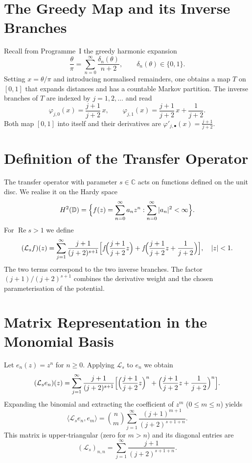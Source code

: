 \documentclass[11pt,a4paper]{article}
\begin{document}
\section{The Greedy Map and its Inverse Branches}
Recall from Programme~I the greedy harmonic expansion
\[
\frac{\theta}{\pi} = \sum_{n=0}^{\infty} \frac{\delta_n(\theta)}{n+2},\qquad \delta_n(\theta)\in\{0,1\}.
\]
Setting \(x = \theta/\pi\) and introducing normalised remainders, one obtains a map \(T\) on \([0,1]\) that expands distances and has a countable Markov partition.  The inverse branches of \(T\) are indexed by \(j=1,2,\dots\) and read
\[
\varphi_{j,0}(x) = \frac{j+1}{j+2}\,x,\qquad 
\varphi_{j,1}(x) = \frac{j+1}{j+2}\,x + \frac{1}{j+2}.
\]
Both map \([0,1]\) into itself and their derivatives are \(\varphi'_{j,\bullet}(x) = \frac{j+1}{j+2}\).

\section{Definition of the Transfer Operator}
The transfer operator with parameter \(s\in\mathbb{C}\) acts on functions defined on the unit disc.  We realise it on the Hardy space
\[
H^2(\mathbb{D}) = \Bigl\{ f(z)=\sum_{n=0}^{\infty} a_n z^n : \sum_{n=0}^{\infty}|a_n|^2 < \infty \Bigr\}.
\]
For \(\operatorname{Re}s>1\) we define
\begin{equation}\label{eq:Ls}
(\mathcal{L}_s f)(z) = \sum_{j=1}^{\infty} \frac{j+1}{(j+2)^{s+1}}
\Bigl[ f\!\Bigl(\frac{j+1}{j+2}z\Bigr) + f\!\Bigl(\frac{j+1}{j+2}z + \frac{1}{j+2}\Bigr) \Bigr], \quad |z|<1.
\end{equation}
The two terms correspond to the two inverse branches.  The factor \((j+1)/(j+2)^{s+1}\) combines the derivative weight and the chosen parameterisation of the potential.

\section{Matrix Representation in the Monomial Basis}
Let \(e_n(z)=z^n\) for \(n\ge 0\).  Applying \(\mathcal{L}_s\) to \(e_n\) we obtain
\[
(\mathcal{L}_s e_n)(z) = \sum_{j=1}^{\infty} \frac{j+1}{(j+2)^{s+1}}
\Bigl[ \Bigl(\frac{j+1}{j+2}z\Bigr)^n + \Bigl(\frac{j+1}{j+2}z + \frac{1}{j+2}\Bigr)^n \Bigr].
\]
Expanding the binomial and extracting the coefficient of \(z^m\) (\(0\le m\le n\)) yields
\[
\langle \mathcal{L}_s e_n, e_m\rangle = \binom{n}{m} \sum_{j=1}^{\infty} \frac{(j+1)^{m+1}}{(j+2)^{s+1+n}}.
\]
This matrix is upper‑triangular (zero for \(m>n\)) and its diagonal entries are
\[
(\mathcal{L}_s)_{n,n} = \sum_{j=1}^{\infty} \frac{j+1}{(j+2)^{s+1+n}}.
\]
\end{document}
